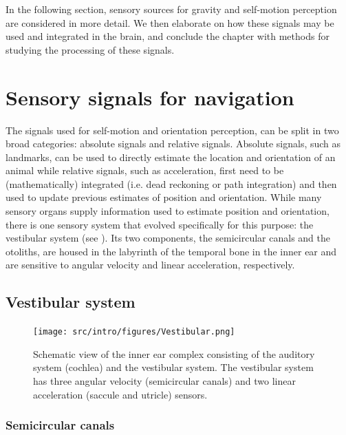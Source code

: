 In the following section, sensory sources for gravity and self-motion perception are considered in more detail. We then elaborate on how these signals may be used and integrated in the brain, and conclude the chapter with methods for studying the processing of these signals. 
 


\section{Sensory signals for navigation}

The signals used for self-motion and orientation perception, can be split in two broad categories: absolute signals and relative signals. Absolute signals, such as landmarks, can be used to directly estimate the location and orientation of an animal while relative signals, such as acceleration, first need to be (mathematically) integrated (i.e. dead reckoning or path integration) and then used to update previous estimates of position and orientation. While many sensory organs supply information used to estimate position and orientation, there is one sensory system that evolved specifically for this purpose: the vestibular system (see ). Its two components, the semicircular canals and the otoliths, are housed in the labyrinth of the temporal bone in the inner ear and are sensitive to angular velocity and linear acceleration, respectively.


\subsection{Vestibular system}

\begin{figure}
    \texttt{[image: src/intro/figures/Vestibular.png]}
    \caption{Schematic view of the inner ear complex consisting of the auditory system (cochlea) and the vestibular system. The vestibular system has three angular velocity (semicircular canals) and two linear acceleration (saccule and utricle) sensors.}
    \label{intro:fig6}
\end{figure}


\subsubsection{Semicircular canals}

